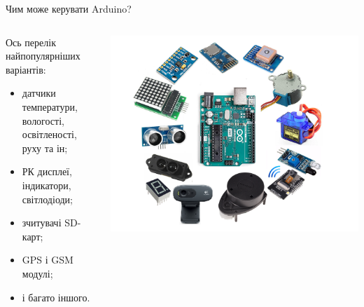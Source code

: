 \documentclass[9pt]{beamer}
\begin{document}
\begin{frame}{Чим може керувати Arduino?}{}
\begin{columns}
	\begin{column}{0.5\linewidth}
         \begin{block}{}
         Ось перелік найпопулярніших варіантів:

         \begin{itemize}
         \item датчики температури, вологості, освітленості, руху та ін;
         \item РК дисплеї, індикатори, світлодіоди;
         \item зчитувачі SD-карт;
         \item GPS і GSM модулі;
         \item і багато іншого.
         \end{itemize}
         \end{block}
	\end{column}
	\begin{column}{0.5\linewidth}
             \begin{center}
                 \includegraphics[width=\linewidth]{pictures/arduino_sensors}
             \end{center}
	\end{column}
\end{columns}


\end{frame}
\end{document}
